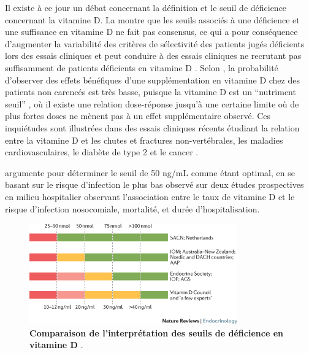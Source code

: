 \documentclass[
  a4paper,
  DIV=11,
  numbers=noendperiod,
  listof=totoc]{scrreprt}
\begin{document}
Il existe à ce jour un débat concernant la définition et le seuil de
déficience concernant la vitamine D. La  montre
que les seuils associés à une déficience et une suffisance en vitamine D
ne fait pas consensus, ce qui a pour conséquence d'augmenter la
variabilité des critères de sélectivité des patients jugés déficients
lors des essais cliniques et peut conduire à des essais cliniques ne
recrutant pas suffisamment de patients déficients en vitamine D
\autocite{Giustina.2020,Bouillon.2017.comparative}. Selon
\textcite{Giustina.2020}, la probabilité d'observer des effets
bénéfiques d'une supplémentation en vitamine D chez des patients non
carencés est très basse, puisque la vitamine D est un ``nutriment
seuil'' \autocite{Heaney.2014}, où il existe une relation dose-réponse
jusqu'à une certaine limite où de plus fortes doses ne mènent pas à un
effet supplémentaire observé. Ces inquiétudes sont illustrées dans des
essais cliniques récents étudiant la relation entre la vitamine D et les
chutes et fractures non-vertébrales, les maladies cardiovasculaires, le
diabète de type 2 et le cancer \autocite{Giustina.2020}.

\textcite{Wimalawansa.2022} argumente pour déterminer le seuil de 50
ng/mL comme étant optimal, en se basant sur le risque d'infection le
plus bas observé sur deux études prospectives en milieu hospitalier
observant l'association entre le taux de vitamine D et le risque
d'infection nosocomiale, mortalité, et durée d'hospitalisation.

\begin{figure}
    \centering
    \includegraphics[width=0.8\textwidth]{
        figures/Bouillon.2017.comparative-Recommendations_for_interpreting_serum_levels_of_25OHD.jpg
    }
    \caption[Comparaison de l'interprétation des seuils de déficience en vitamine
    D.]{\textbf{Comparaison de l'interprétation des seuils de déficience en
    vitamine D }\autocite{Bouillon.2017.comparative}.}
    \label{fig-vd-comparison}
\end{figure}
\end{document}
